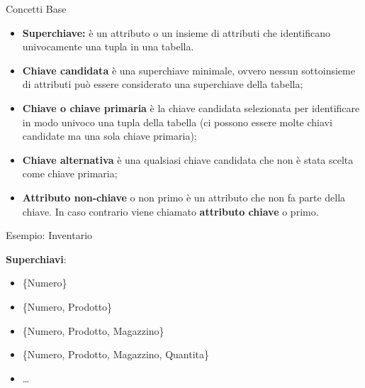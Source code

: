 %
\begin{frame}{Concetti Base}
    \begin{itemize}[<+->]
        \item \textbf{Superchiave:} \`e un attributo o un insieme di attributi che identificano univocamente una tupla in una tabella.
        \item \textbf{Chiave candidata} \`e una superchiave minimale, ovvero nessun sottoinsieme di attributi pu\`o essere considerato una superchiave della tabella;
        \item \textbf{Chiave o chiave primaria} \`e la chiave candidata selezionata per identificare in modo univoco una tupla della tabella (ci possono essere molte chiavi candidate ma una sola chiave primaria);
        \item \textbf{Chiave alternativa} \`e una qualsiasi chiave candidata che non \`e stata scelta come chiave primaria;
        \item \textbf{Attributo non-chiave} o {non primo} \`e un attributo che non fa parte della chiave. In caso contrario viene chiamato \textbf{attributo chiave} o {primo}.
    \end{itemize}
\end{frame}
%
\begin{frame}{Esempio: Inventario}
\vspace{-1cm}
\begin{center}
    \InventarioModified
\end{center}
\pause
\textbf{Superchiavi}:
\pause
\begin{itemize}[<+->]
    \item \{Numero\}
    \item \{Numero, Prodotto\}
    \item \{Numero, Prodotto, Magazzino\}
    \item \{Numero, Prodotto, Magazzino, Quantita\}
    \item \ldots
\end{itemize}
\end{frame}
